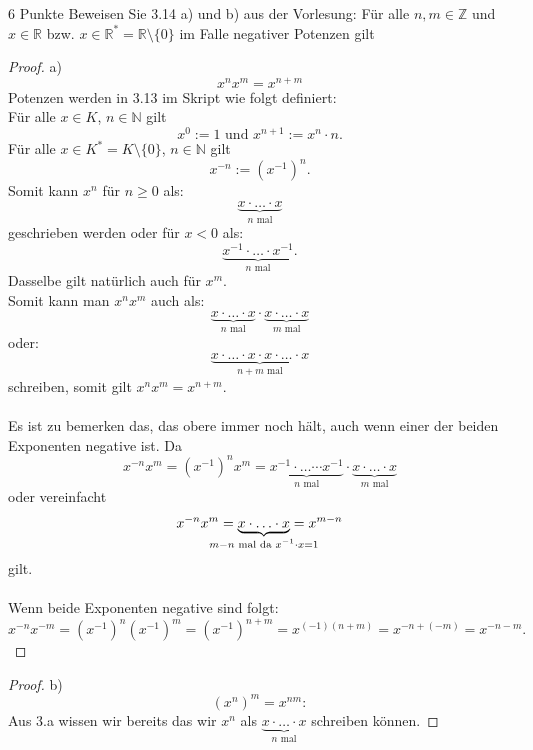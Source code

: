 \documentclass{problemset}
\begin{document}
\begin{problem}{6 Punkte}
Beweisen Sie 3.14 a) und b) aus der Vorlesung:
\newline\newline
Für alle $n,m \in \mathbb{Z}$ und $x \in \mathbb{R}$ bzw. $x \in \mathbb{R}^* = \mathbb{R}\setminus\{0\}$ im Falle negativer Potenzen gilt
\begin{proof}
    a)
    \begin{displaymath}
        x^nx^m = x^{n+m}
    \end{displaymath}
    Potenzen werden in 3.13 im Skript wie folgt definiert: \\
    Für alle $x \in K$, $n \in \mathbb{N}$ gilt
    \[
        x^0 := 1 \text{ und } x^{n+1}:=x^n \cdot n.
    \]
    Für alle $x \in K^*=K\setminus\{0\}$, $n \in \mathbb{N}$ gilt \[
        x^{-n} := (x^{-1})^n.
    \]
    Somit kann $x^n$ für $n \ge 0$ als: \[
        \underbrace{x \cdot \ldots \cdot x}_{n\text{ mal}}
    \] geschrieben werden oder für $x < 0$ als: \[
        \underbrace{x^{-1} \cdot \ldots \cdot x^{-1}}_{n\text{ mal}}.
    \]
    Dasselbe gilt natürlich auch für $x^m$. \\ Somit kann man $x^nx^m$ auch
    als: \[
        \underbrace{x \cdot \ldots \cdot x}_{n\text{ mal}} \cdot \underbrace{x \cdot \ldots \cdot x}_{m\text{ mal}}
    \] oder: \[
        \underbrace{x \cdot \ldots \cdot x \cdot x \cdot \ldots \cdot x}_{n+m\text{ mal}}
    \] schreiben, somit gilt $x^nx^m = x^{n+m}$. \\ \\ Es ist zu bemerken das,
       das obere immer noch hält, auch wenn einer der beiden Exponenten
       negative ist. Da \[
        x^{-n}x^m = {(x^{-1})}^nx^m = \underbrace{x^{-1} \cdot\ldots\cdots x^{-1}}_{n\text{ mal}} \cdot \underbrace{x \cdot \ldots \cdot x}_{m\text{ mal}}
    \] oder vereinfacht \[
        x^{-n}x^m = \underbrace{x \cdot \ldots \cdot x}_{\mathclap{m - n\text{ mal da } x^{-1} \cdot x = 1}} = x^{m-n}
    \] gilt. \\ \\ Wenn beide Exponenten negative sind folgt: \[
        x^{-n}x^{-m} = {(x^{-1})}^n{(x^{-1})}^m = {(x^{-1})}^{n+m} = x^{(-1)(n+m)} = x^{-n+(-m)} = x^{-n-m}.
    \]
\end{proof}
\begin{proof}
    b)
    \begin{displaymath}
        {(x^n)}^m = x^{nm}:
    \end{displaymath}
    Aus 3.a wissen wir bereits das wir $x^n$ als $\underbrace{x \cdot \ldots \cdot x}_{n\text{ mal}}$ schreiben können.

\end{proof}
\end{problem}
\end{document}
